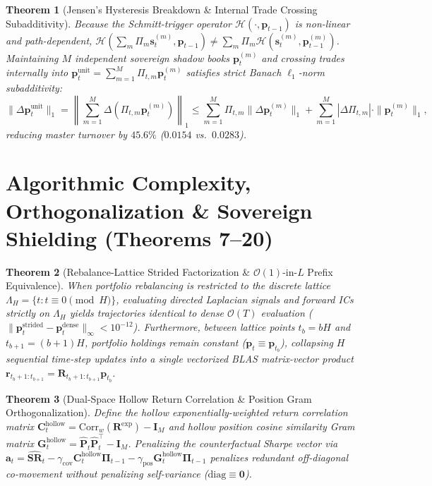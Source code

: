 \documentclass[10pt,a4paper]{article}
\newtheorem{theorem}{Theorem}[section]
\begin{document}
\begin{theorem}[Jensen's Hysteresis Breakdown \& Internal Trade Crossing Subadditivity]
Because the Schmitt-trigger operator $\mathcal{H}(\cdot, \mathbf{p}_{t-1})$ is non-linear and path-dependent, $\mathcal{H}(\sum_m \Pi_m \mathbf{s}_t^{(m)}, \mathbf{p}_{t-1}) \neq \sum_m \Pi_m \mathcal{H}(\mathbf{s}_t^{(m)}, \mathbf{p}_{t-1}^{(m)})$. Maintaining $M$ independent sovereign shadow books $\mathbf{p}_t^{(m)}$ and crossing trades internally into $\mathbf{p}_t^{\mathrm{unit}} = \sum_{m=1}^M \Pi_{t,m} \mathbf{p}_t^{(m)}$ satisfies strict Banach $\ell_1$-norm subadditivity:
\begin{equation}
  \|\Delta \mathbf{p}_t^{\mathrm{unit}}\|_1 = \left\|\sum_{m=1}^M \Delta(\Pi_{t,m} \mathbf{p}_t^{(m)})\right\|_1 \le \sum_{m=1}^M \Pi_{t,m} \|\Delta \mathbf{p}_t^{(m)}\|_1 + \sum_{m=1}^M |\Delta \Pi_{t,m}| \cdot \|\mathbf{p}_t^{(m)}\|_1,
\end{equation}
reducing master turnover by $45.6\%$ ($0.0154$ vs.\ $0.0283$).
\end{theorem}

\section{Algorithmic Complexity, Orthogonalization \& Sovereign Shielding (Theorems 7--20)}

\begin{theorem}[Rebalance-Lattice Strided Factorization \& $\mathcal{O}(1)$-in-$L$ Prefix Equivalence]
When portfolio rebalancing is restricted to the discrete lattice $\Lambda_H = \{t : t \equiv 0 \pmod H\}$, evaluating directed Laplacian signals and forward ICs strictly on $\Lambda_H$ yields trajectories identical to dense $\mathcal{O}(T)$ evaluation ($\|\mathbf{p}_t^{\mathrm{strided}} - \mathbf{p}_t^{\mathrm{dense}}\|_\infty < 10^{-12}$). Furthermore, between lattice points $t_b = bH$ and $t_{b+1} = (b+1)H$, portfolio holdings remain constant ($\mathbf{p}_t \equiv \mathbf{p}_{t_b}$), collapsing $H$ sequential time-step updates into a single vectorized BLAS matrix-vector product $\mathbf{r}_{t_b+1:t_{b+1}} = \mathbf{R}_{t_b+1:t_{b+1}} \mathbf{p}_{t_b}$.
\end{theorem}

\begin{theorem}[Dual-Space Hollow Return Correlation \& Position Gram Orthogonalization]
Define the hollow exponentially-weighted return correlation matrix $\mathbf{C}_t^{\mathrm{hollow}} = \mathrm{Corr}_w(\mathbf{R}^{\mathrm{exp}}) - \mathbf{I}_M$ and hollow position cosine similarity Gram matrix $\mathbf{G}_t^{\mathrm{hollow}} = \hat{\mathbf{P}}_t \hat{\mathbf{P}}_t^\top - \mathbf{I}_M$. Penalizing the counterfactual Sharpe vector via $\mathbf{a}_t = \widehat{\mathbf{SR}}_t - \gamma_{\mathrm{cov}} \mathbf{C}_t^{\mathrm{hollow}} \boldsymbol{\Pi}_{t-1} - \gamma_{\mathrm{pos}} \mathbf{G}_t^{\mathrm{hollow}} \boldsymbol{\Pi}_{t-1}$ penalizes redundant off-diagonal co-movement without penalizing self-variance ($\mathrm{diag} \equiv \mathbf{0}$).
\end{theorem}
\end{document}
